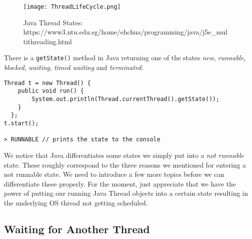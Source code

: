 \documentclass[main.tex]{subfiles}
\begin{document}
\begin{figure}[H]
    \centering
    \texttt{[image: ThreadLifeCycle.png]}
    \caption{Java Thread States: https://www3.ntu.edu.sg/home/ehchua/programming/java/j5e\_multithreading.html}
\end{figure}
There is a \texttt{getState()} method in Java returning one of the states \textit{new}, \textit{runnable}, \textit{blocked}, \textit{waiting}, \textit{timed waiting} and \textit{terminated}:
\begin{verbatim}
Thread t = new Thread() {
    public void run() {
        System.out.println(Thread.currentThread().getState());
    }
  };
t.start();

> RUNNABLE // prints the state to the console
\end{verbatim}
We notice that Java differentiates some states we simply put into a \textit{not runnable} state. These roughly correspond to the three reasons we mentioned for entering a not runnable state. We need to introduce a few more topics before we can differentiate these properly. For the moment, just appreciate that we have the power of putting our running Java Thread objects into a certain state resulting in the underlying OS thread not getting scheduled.

\subsection{Waiting for Another Thread}
\end{document}
